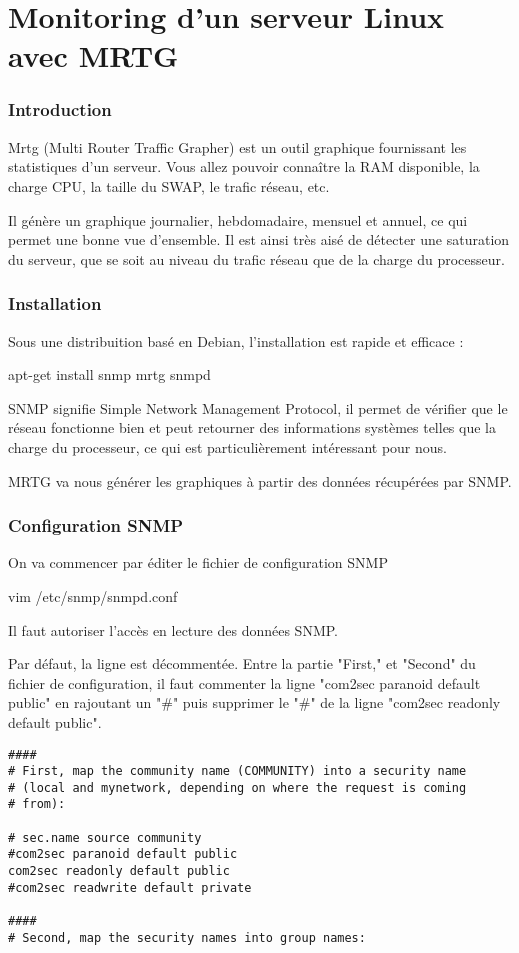 \vfill \pagebreak
\part{Monitoring d'un serveur Linux avec MRTG}

\section{Introduction}

Mrtg (Multi Router Traffic Grapher) est un outil graphique fournissant les statistiques d'un serveur. Vous allez pouvoir connaître la RAM disponible, la charge CPU, la taille du SWAP, le trafic réseau, etc.

Il génère un graphique journalier, hebdomadaire, mensuel et annuel, ce qui permet une bonne vue d'ensemble. Il est ainsi très aisé de détecter une saturation du serveur, que se soit au niveau du trafic réseau que de la charge du processeur.

\section{Installation}

Sous une distribuition basé en Debian, l'installation est rapide et efficace :

apt-get install snmp mrtg snmpd

SNMP signifie Simple Network Management Protocol, il permet de vérifier que le réseau fonctionne bien et peut retourner des informations systèmes telles que la charge du processeur, ce qui est particulièrement intéressant pour nous.

MRTG va nous générer les graphiques à partir des données récupérées par SNMP.


\section{Configuration SNMP}

On va commencer par éditer le fichier de configuration SNMP

vim /etc/snmp/snmpd.conf


Il faut autoriser l'accès en lecture des données SNMP.

Par défaut, la ligne est décommentée. Entre la partie "First," et "Second" du fichier de configuration, il faut commenter la ligne "com2sec paranoid default public" en rajoutant un "\#" puis supprimer le "\#" de la ligne "com2sec readonly default public".
\begin{verbatim}
####
# First, map the community name (COMMUNITY) into a security name
# (local and mynetwork, depending on where the request is coming
# from):

# sec.name source community
#com2sec paranoid default public
com2sec readonly default public
#com2sec readwrite default private

####
# Second, map the security names into group names:
\end{verbatim}

